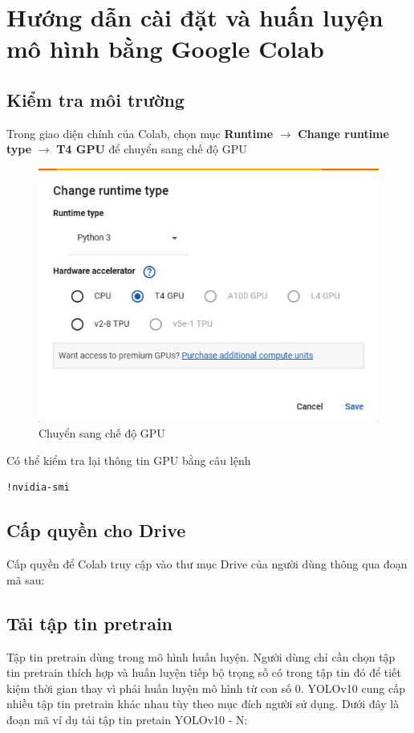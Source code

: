 \section{Hướng dẫn cài đặt và huấn luyện mô hình bằng Google Colab}
\subsection{Kiểm tra môi trường}
Trong giao diện chính của Colab, chọn mục \textbf{Runtime} $\xrightarrow{}$ \textbf{Change runtime type} $\xrightarrow{}$ \textbf{T4 GPU} để chuyển sang chế độ GPU
\begin{figure}[H]
\centering
\includegraphics[scale=.4]{img/gpu.JPG}
\caption{Chuyển sang chế độ GPU}
\label{fig:my_label_with_H}
\end{figure}

Có thể kiểm tra lại thông tin GPU bằng câu lệnh
\begin{lstlisting}[language=tex]
!nvidia-smi
\end{lstlisting}

\subsection{Cấp quyền cho Drive}
Cấp quyền để Colab truy cập vào thư mục Drive của người dùng thông qua đoạn mã sau:


\subsection{Tải tập tin pretrain}
Tập tin pretrain dùng trong mô hình huấn luyện. Người dùng chỉ cần chọn tập tin pretrain thích hợp và huấn luyện tiếp bộ trọng số có trong tập tin đó để tiết kiệm thời gian thay vì phải huấn luyện mô hình từ con số 0. YOLOv10 cung cấp nhiều tập tin pretrain khác nhau tùy theo mục đích người sử dụng. Dưới đây là đoạn mã ví dụ tải tập tin pretain YOLOv10 - N:


